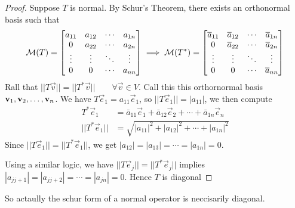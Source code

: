 \begin{proof}
	\noindent Suppose $T$ is normal. By Schur's Theorem, there exists an orthonormal basis such that
	\[ \mathcal M(T) = \begin{bmatrix}
	a_{11} & a_{12} & \cdots & a_{1n} \\
	0 & a_{22} & \cdots & a_{2n} \\
	\vdots & \vdots & \ddots & \vdots\\
	0 & 0 & \cdots & a_{nn} 
	\end{bmatrix} \implies \mathcal M(T^*) = \begin{bmatrix}
	\overline a_{11} & \overline a_{12} & \cdots & \overline a_{1n} \\
	0 & \overline a_{22} & \cdots & \overline a_{2n} \\
	\vdots & \vdots & \ddots & \vdots\\
	0 & 0 & \cdots & \overline a_{nn} 
	\end{bmatrix} \]
	Rall that $||T\vec v|| = ||T^* \vec v|| \qquad \forall \vec v \in V$. Call this this orthornormal basis ${\mathbf v}_1,{\mathbf v}_2, \ldots, {\mathbf v}_{n}$. We have $T\vec e_1 = a_{11}\vec e_1$, so $||T\vec e_1|| = |a_{11}|$, we then compute 
	\begin{align*}
		T^* \vec e_1 &= \bar a_{11} \vec e_1 + \bar a_{12} \vec e_2 + \cdots + \bar a_{1n} \vec e_n \\
		||T^*\vec e_1 || &= \sqrt{|a_{11}|^2 + |a_{12}|^2 + \cdots + |a_{1n}|^2}
	\end{align*}
	Since $||T\vec e_1|| = ||T^* \vec e_1||$, we get $|a_{12}| = |a_{13}| = \cdots = |a_{1n}| = 0$. 

	\noindent
	Using a similar logic, we have $||T\vec e_j|| = ||T^*\vec e_j||$ implies $|a_{jj+1}| = |a_{jj+2}| = \cdots = |a_{jn}| = 0$. Hence $T$ is diagonal
\end{proof}
\begin{remark}
	So actaully the schur form of a normal operator is neccisarily diagonal.
\end{remark}
\newpage
